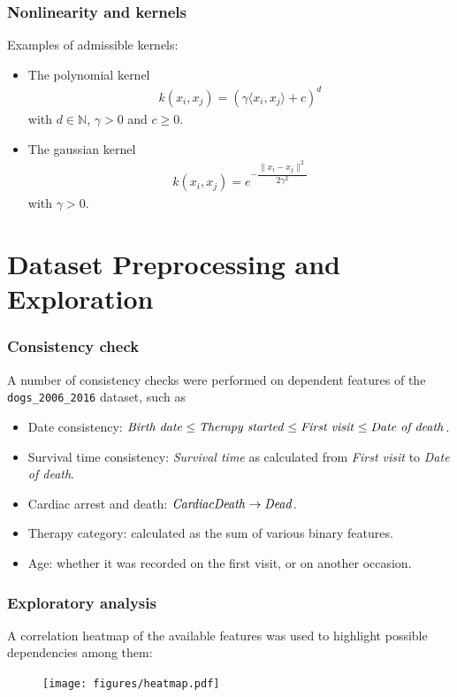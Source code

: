 \documentclass{beamer}
\newcommand*{\sectionp}{\usebeamertemplate*{section p}}
\begin{document}
\begin{frame}
\frametitle{Nonlinearity and kernels}
Examples of admissible kernels:
\begin{itemize}
\item The polynomial kernel \begin{align*}
k(x_{i},x_{j}) = (\gamma\langle x_{i},x_{j} \rangle + c)^{d}
\end{align*}
with $ d \in \mathbb{N} $, $ \gamma > 0 $ and $ c \geq 0 $.
\item The gaussian kernel \begin{align*}
k(x_{i},x_{j}) = e^{-\dfrac{\| x_{i}-x_{j} \|^{2}}{2\gamma^{2}}}
\end{align*}
with $ \gamma > 0 $.
\end{itemize}
\end{frame}

\section{Dataset Preprocessing and Exploration}
\frame{\sectionp}

\begin{frame}
\frametitle{Consistency check}
A number of consistency checks were performed on dependent features of the \texttt{dogs\_2006\_2016} dataset, such as
\begin{itemize}
\item Date consistency: $ \text{\emph{Birth date}} \leq \text{\emph{Therapy started}} \leq \text{\emph{First visit}} \leq \text{\emph{Date of death}} $.
\item Survival time consistency: \textit{Survival time} as calculated from \textit{First visit} to \textit{Date of death}.
\item Cardiac arrest and death: $\text{\emph{CardiacDeath}} \rightarrow \text{\emph{Dead}} $.
\item Therapy category: calculated as the sum of various binary features.
\item Age: whether it was recorded on the first visit, or on another occasion.
\end{itemize}
\end{frame}


\begin{frame}
\frametitle{Exploratory analysis}
A correlation heatmap of the available features was used to highlight possible dependencies among them:
\begin{figure}[h]
  \vspace{-0.2cm}
  \centering
  	\texttt{[image: figures/heatmap.pdf]}
\end{figure}
\end{frame}
\end{document}
